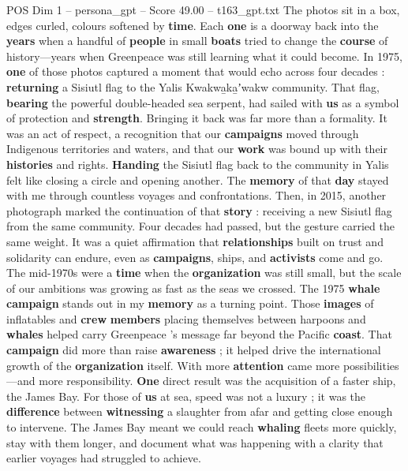\begin{textsample}{POS Dim 1 – persona\_gpt – Score 49.00 – t163\_gpt.txt}  \label{ex:f1_pos_023}
The photos sit in a box, edges curled, colours softened by \textbf{time}.
Each \textbf{one} is a doorway back into the \textbf{years} when a handful of \textbf{people} in small \textbf{boats} tried to change the \textbf{course} of history—years when Greenpeace was still learning what it could become.
In 1975, \textbf{one} of those photos captured a moment that would echo across four decades : \textbf{returning} a Sisiutl flag to the Yalis Kwakwa̱ka̱ʼwakw community.
That flag, \textbf{bearing} the powerful double-headed sea serpent, had sailed with \textbf{us} as a symbol of protection and \textbf{strength}.
Bringing it back was far more than a formality.
It was an act of respect, a recognition that our \textbf{campaigns} moved through Indigenous territories and waters, and that our \textbf{work} was bound up with their \textbf{histories} and rights. \textbf{Handing} the Sisiutl flag back to the community in Yalis felt like closing a circle and opening another.
The \textbf{memory} of that \textbf{day} stayed with me through countless voyages and confrontations.
Then, in 2015, another photograph marked the continuation of that \textbf{story} : receiving a new Sisiutl flag from the same community.
Four decades had passed, but the gesture carried the same weight.
It was a quiet affirmation that \textbf{relationships} built on trust and solidarity can endure, even as \textbf{campaigns}, ships, and \textbf{activists} come and go.
The mid-1970s were a \textbf{time} when the \textbf{organization} was still small, but the scale of our ambitions was growing as fast as the seas we crossed.
The 1975 \textbf{whale} \textbf{campaign} stands out in my \textbf{memory} as a turning point.
Those \textbf{images} of inflatables and \textbf{crew} \textbf{members} placing themselves between harpoons and \textbf{whales} helped carry Greenpeace ’s message far beyond the Pacific \textbf{coast}.
That \textbf{campaign} did more than raise \textbf{awareness} ; it helped drive the international growth of the \textbf{organization} itself.
With more \textbf{attention} came more possibilities—and more responsibility. \textbf{One} direct result was the acquisition of a faster ship, the James Bay.
For those of \textbf{us} at sea, speed was not a luxury ; it was the \textbf{difference} between \textbf{witnessing} a slaughter from afar and getting close enough to intervene.
The James Bay meant we could reach \textbf{whaling} fleets more quickly, stay with them longer, and document what was happening with a clarity that earlier voyages had struggled to achieve.

\end{textsample}

